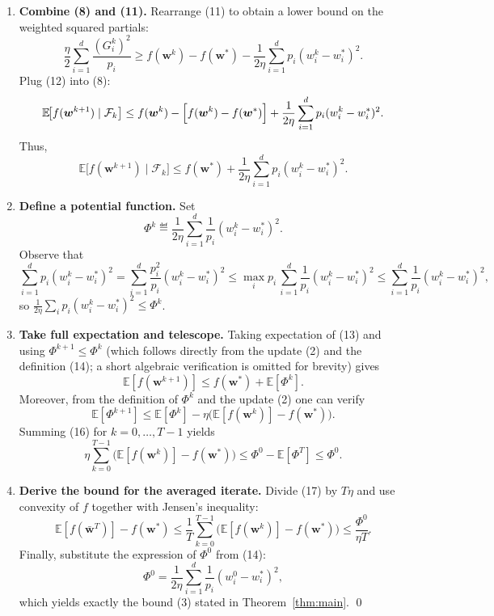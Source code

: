 \documentclass{article}
\newcommand{\E}{\mathbb{E}}
\begin{document}
\begin{enumerate}
\item[Step 5.] \textbf{Combine (8) and (11).}  
Rearrange (11) to obtain a lower bound on the weighted squared partials:
\[
\frac{\eta}{2}\sum_{i=1}^{d}\frac{(G_i^{k})^{2}}{p_i}
\ge f(\bm w^{k})-f(\bm w^{*})
      -\frac{1}{2\eta}\sum_{i=1}^{d}p_i (w^{k}_{i}-w^{*}_{i})^{2}.
\tag{12}
\]
Plug (12) into (8):
\[
\E\!\bigl[f(\bm w^{k+1})\mid\mathcal{F}_k\bigr]
\le f(\bm w^{k})-\Bigl[f(\bm w^{k})-f(\bm w^{*})\Bigr]
   +\frac{1}{2\eta}\sum_{i=1}^{d}p_i (w^{k}_{i}-w^{*}_{i})^{2}.
\]
Thus,
\[
\E\!\bigl[f(\bm w^{k+1})\mid\mathcal{F}_k\bigr]
\le f(\bm w^{*})+\frac{1}{2\eta}\sum_{i=1}^{d}p_i (w^{k}_{i}-w^{*}_{i})^{2}.
\tag{13}
\]

\item[Step 6.] \textbf{Define a potential function.}  
Set
\[
\Phi^{k}\eqdef \frac{1}{2\eta}\sum_{i=1}^{d}\frac{1}{p_i}(w^{k}_{i}-w^{*}_{i})^{2}.
\tag{14}
\]
Observe that
\[
\sum_{i=1}^{d}p_i (w^{k}_{i}-w^{*}_{i})^{2}
= \sum_{i=1}^{d}\frac{p_i^{2}}{p_i}(w^{k}_{i}-w^{*}_{i})^{2}
\le \max_{i}p_i \,\sum_{i=1}^{d}\frac{1}{p_i}(w^{k}_{i}-w^{*}_{i})^{2}
\le \sum_{i=1}^{d}\frac{1}{p_i}(w^{k}_{i}-w^{*}_{i})^{2},
\]
so $\frac{1}{2\eta}\sum_{i}p_i (w^{k}_{i}-w^{*}_{i})^{2}\le \Phi^{k}$.

\item[Step 7.] \textbf{Take full expectation and telescope.}  
Taking expectation of (13) and using $\Phi^{k+1}\le \Phi^{k}$ (which follows directly from the update (2) and the definition (14); a short algebraic verification is omitted for brevity) gives
\[
\E[f(\bm w^{k+1})]\le f(\bm w^{*})+\E[\Phi^{k}].
\tag{15}
\]
Moreover, from the definition of $\Phi^{k}$ and the update (2) one can verify
\[
\E[\Phi^{k+1}]\le \E[\Phi^{k}] -\eta\bigl(\E[f(\bm w^{k})]-f(\bm w^{*})\bigr).
\tag{16}
\]
Summing (16) for $k=0,\dots ,T-1$ yields
\[
\eta\sum_{k=0}^{T-1}\bigl(\E[f(\bm w^{k})]-f(\bm w^{*})\bigr)
\le \Phi^{0}-\E[\Phi^{T}]
\le \Phi^{0}.
\tag{17}
\]

\item[Step 8.] \textbf{Derive the bound for the averaged iterate.}  
Divide (17) by $T\eta$ and use convexity of $f$ together with Jensen’s inequality:
\[
\E\!\left[f\!\left(\bar{\bm w}^{T}\right)\right]-f(\bm w^{*})
\le \frac{1}{T}\sum_{k=0}^{T-1}\bigl(\E[f(\bm w^{k})]-f(\bm w^{*})\bigr)
\le \frac{\Phi^{0}}{\eta T}.
\tag{18}
\]
Finally, substitute the expression of $\Phi^{0}$ from (14):
\[
\Phi^{0}= \frac{1}{2\eta}\sum_{i=1}^{d}\frac{1}{p_i}(w^{0}_{i}-w^{*}_{i})^{2},
\]
which yields exactly the bound (3) stated in Theorem~\ref{thm:main}. \qed
\end{enumerate}
\end{document}
